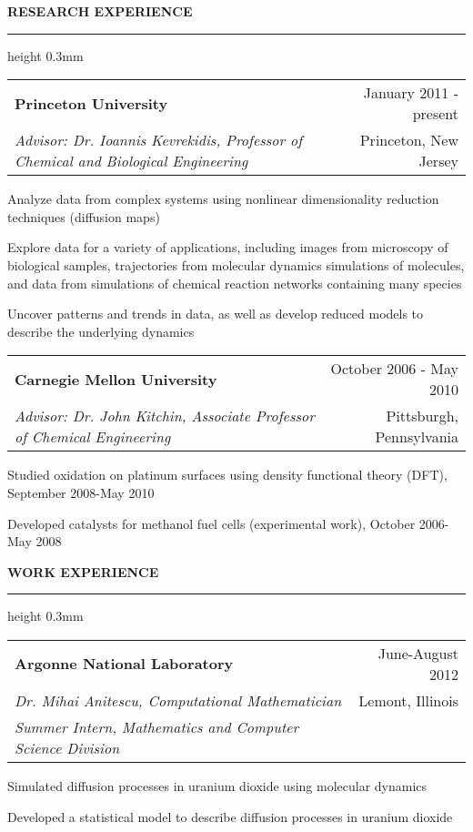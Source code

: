 \documentclass[letterpaper,10pt]{article}
\makeatletter
\newenvironment{itemize*}
  {\begin{itemize}
    \setlength{\parskip}{-2pt}}
  {\end{itemize}}
\newcommand{\cvheading}[1]{
\vspace{0.11in}
\noindent
\MakeUppercase{\bf #1}
\vspace{0.05in}
{\hrule height 0.3mm}
\vspace{0.05in}}
\newcommand{\workplace}[4]{
\noindent
\vspace{0.011in}
\begin{tabular*}{1.0\textwidth}{@{\extracolsep{\fill}} l r}
{\bf #1} & #2\\
{\em #3} & #4\\
\end{tabular*}
\vspace{-0.14in}
}
\newcommand{\workplaceadvisor}[5]{
\noindent
\vspace{0.011in}
\begin{tabular*}{1.0\textwidth}{@{\extracolsep{\fill}} l r}
{\bf #1} & #2\\
{\em #3} & #4\\
{\em #5} & \\
\end{tabular*}
\vspace{-0.14in}
}
\newcommand{\spacing}[0]{
\vspace{0.1in}
}
\makeatother
\begin{document}
\cvheading{Research Experience}
\workplace{Princeton University}{January 2011 - present}{Advisor: Dr. Ioannis Kevrekidis, Professor of Chemical and Biological Engineering}{Princeton, New Jersey}
\begin{itemize*}
\item Analyze data from complex systems using nonlinear dimensionality reduction techniques (diffusion maps)%
\item Explore data for a variety of applications, including images from microscopy of biological samples, trajectories from molecular dynamics simulations of molecules, and data from simulations of chemical reaction networks containing many species
\item Uncover patterns and trends in data, as well as develop reduced models to describe the underlying dynamics
\end{itemize*}

\spacing

\workplace{Carnegie Mellon University}{October 2006 - May 2010}{Advisor: Dr. John Kitchin, Associate Professor of Chemical Engineering}{Pittsburgh, Pennsylvania}
\begin{itemize*}
\item Studied oxidation on platinum surfaces using density functional theory (DFT), September 2008-May 2010
\item Developed catalysts for methanol fuel cells (experimental work), October 2006-May 2008
\end{itemize*}


\cvheading{Work Experience}
\workplaceadvisor{Argonne National Laboratory}{June-August 2012}{Dr. Mihai Anitescu, Computational Mathematician}{Lemont, Illinois}{Summer Intern, Mathematics and Computer Science Division}
\begin{itemize*}
\item Simulated diffusion processes in uranium dioxide using molecular dynamics
\item Developed a statistical model to describe diffusion processes in uranium dioxide
\end{itemize*}
\end{document}
